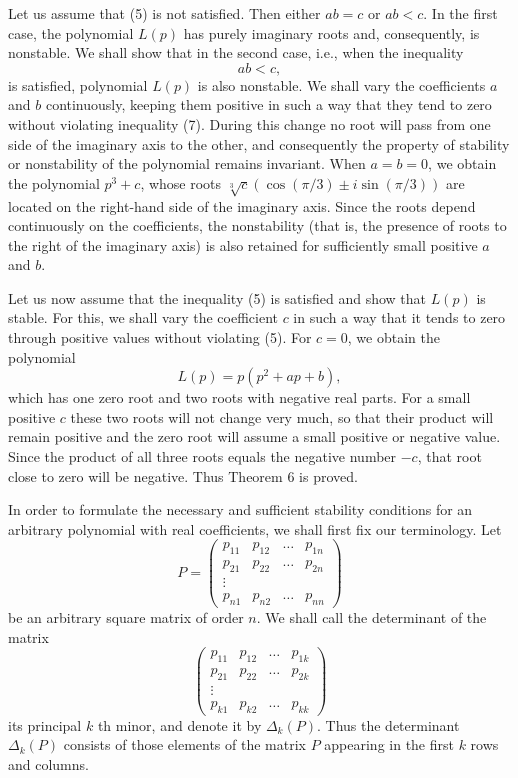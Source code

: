 \documentclass[10pt,a5paper]{book}
\makeatletter
\theoremstyle{plain}
\theoremstyle{definition}
\theoremstyle{remark}
\renewenvironment{proof}[1][\proofname]{\par
  \pushQED{\qed}%
  \normalfont\topsep6\p@\@plus6\p@\relax
  \trivlist
  \item\relax{\itshape #1\@addpunct{.}}\hspace\labelsep\ignorespaces
}{\popQED\endtrivlist\@endpefalse}
\makeatother
\begin{document}
\begin{proof}
Let us assume that (5) is not satisfied. Then either $a b=c$ or $a b<c$. In the first case, the polynomial $L(p)$ has purely imaginary roots and, consequently, is nonstable. We shall show that in the second case, i.e., when the inequality
\begin{equation*}
a b<c, \tag{7}
\end{equation*}
is satisfied, polynomial $L(p)$ is also nonstable. We shall vary the coefficients
$a$ and $b$ continuously, keeping them positive in such a way that they tend to zero without violating inequality (7). During this change no root will pass from one side of the imaginary axis to the other, and consequently the property of stability or nonstability of the polynomial remains invariant. When $a=b=0$, we obtain the polynomial $p^{3}+c$, whose roots $\sqrt[3]{c}(\cos (\pi / 3) \pm i \sin (\pi / 3))$ are located on the right-hand side of the imaginary axis. Since the roots depend continuously on the coefficients, the nonstability (that is, the presence of roots to the right of the imaginary axis) is also retained for sufficiently small positive $a$ and $b$.

Let us now assume that the inequality (5) is satisfied and show that $L(p)$ is stable. For this, we shall vary the coefficient $c$ in such a way that it tends to zero through positive values without violating (5). For $c=0$, we obtain the polynomial
\[
L(p)=p\left(p^{2}+a p+b\right),
\]
which has one zero root and two roots with negative real parts. For a small positive $c$ these two roots will not change very much, so that their product will remain positive and the zero root will assume a small positive or negative value. Since the product of all three roots equals the negative number $-c$, that root close to zero will be negative. Thus Theorem 6 is proved.

In order to formulate the necessary and sufficient stability conditions for an arbitrary polynomial with real coefficients, we shall first fix our terminology. Let
\[
P=\left(\begin{array}{cccc}
p_{11} & p_{12} & \ldots & p_{1 n} \\
p_{21} & p_{22} & \ldots & p_{2 n} \\
\vdots & & & \\
p_{n 1} & p_{n 2} & \ldots & p_{n n}
\end{array}\right)
\]
be an arbitrary square matrix of order $n$. We shall call the determinant of the matrix
\[
\left(\begin{array}{cccc}
p_{11} & p_{12} & \ldots & p_{1 k} \\
p_{21} & p_{22} & \ldots & p_{2 k} \\
\vdots & & & \\
p_{k 1} & p_{k 2} & \ldots & p_{k k}
\end{array}\right)
\]
its principal $k$ th minor, and denote it by $\Delta_{k}(P)$. Thus the determinant $\Delta_{k}(P)$ consists of those elements of the matrix $P$ appearing in the first $k$ rows and columns.
\end{proof}
\end{document}
